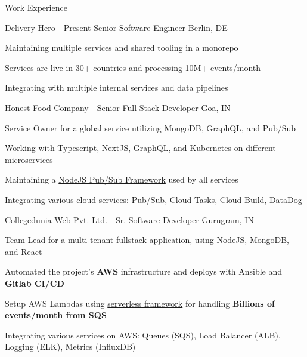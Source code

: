 \documentclass[../resume.tex]{subfiles}
\begin{document}
\begin{rSection}{Work Experience}

\begin{rSubsection}
    {\href{https://www.deliveryhero.com/}{Delivery Hero}}
    {  - Present }
    {Senior Software Engineer}
    {Berlin, DE}

    \item Maintaining multiple services and shared tooling in a monorepo
    \item Services are live in 30+ countries and processing 10M+ events/month
    \item Integrating with multiple internal services and data pipelines

\begin{rSubsection}
    {\href{https://go.rohit.page/hfc}{Honest Food Company}}
    {  -  }
    {Senior Full Stack Developer}
    {Goa, IN}

    \item Service Owner for a global service utilizing MongoDB, GraphQL, and Pub/Sub
    \item Working with Typescript, NextJS, GraphQL, and Kubernetes on different microservices
    \item Maintaining a \href{https://github.com/deliveryhero/hfc-pubsub}{NodeJS Pub/Sub Framework} used by all services
    \item Integrating various cloud services: Pub/Sub, Cloud Tasks, Cloud Build, DataDog

\end{rSubsection}

\begin{rSubsection}
    {\href{https://go.rohit.page/cd}{Collegedunia Web Pvt. Ltd.}}
    {  -  }
    {Sr. Software Developer}
    {Gurugram, IN}

    \item Team Lead for a multi-tenant fullstack application, using NodeJS, MongoDB, and React
    \item Automated the project's \textbf{AWS} infrastructure and deploys with Ansible and \textbf{Gitlab CI/CD}
    \item Setup AWS Lambdas using \href{https://www.serverless.com/}{serverless framework} for handling \textbf{Billions of events/month from SQS}
    \item Integrating various services on AWS: Queues (SQS), Load Balancer (ALB), Logging (ELK), Metrics (InfluxDB)


\end{rSubsection}
\end{rSubsection}
\end{rSection}
\end{document}
